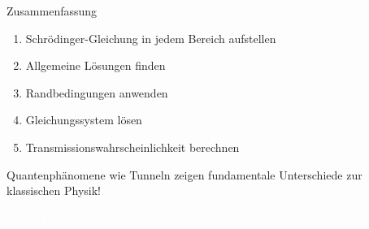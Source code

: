 \documentclass{beamer}
\begin{document}
    \begin{frame}{Zusammenfassung}
        \begin{enumerate}
            \item Schrödinger-Gleichung in jedem Bereich aufstellen
            \item Allgemeine Lösungen finden
            \item Randbedingungen anwenden
            \item Gleichungssystem lösen
            \item Transmissionswahrscheinlichkeit berechnen
        \end{enumerate}

        Quantenphänomene wie Tunneln zeigen fundamentale Unterschiede zur klassischen Physik!
    \end{frame}

    
    \begin{frame}
        \centering
        \Huge
        \textcolor{white}{Vielen Dank für Ihre Aufmerksamkeit!}
    \end{frame}
\end{document}
